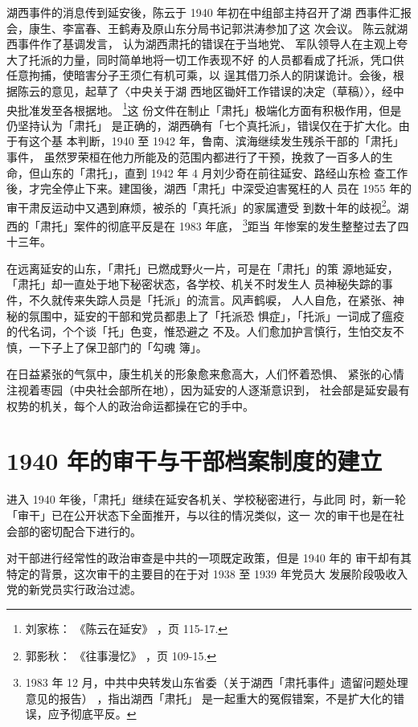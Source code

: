 湖西事件的消息传到延安後，陈云于 1940 年初在中组部主持召开了湖
西事件汇报会，康生、李富春、王鹤寿及原山东分局书记郭洪涛参加了这
次会议。
陈云就湖西事件作了基调发言，
认为湖西肃托的错误在于当地党、
军队领导人在主观上夸大了托派的力量，同时简单地将一切工作表现不好
的人员都看成了托派，凭口供任意拘捕，使暗害分子王须仁有机可乘，以
逞其借刀杀人的阴谋诡计。会後，根据陈云的意见，起草了〈中央关于湖
西地区锄奸工作错误的决定（草稿）〉，经中央批准发至各根据地。
\footnote{刘家栋：
《陈云在延安》
，页 115-17.}这
份文件在制止「肃托」极端化方面有积极作用，但是仍坚持认为「肃托」
是正确的，湖西确有「七个真托派」，错误仅在于扩大化。由于有这个基
本判断，1940 至 1942 年，鲁南、滨海继续发生残杀干部的「肃托」事件，
虽然罗荣桓在他力所能及的范围内都进行了干预，挽救了一百多人的生
命，但山东的「肃托」，直到 1942 年 4 月刘少奇在前往延安、路经山东检
查工作後，才完全停止下来。建国後，湖西「肃托」中深受迫害冤枉的人
员在 1955 年的审干肃反运动中又遇到麻烦，被杀的「真托派」的家属遭受
到数十年的歧视\footnote{郭影秋：
《往事漫忆》
，页 109-15.}。湖西的「肃托」案件的彻底平反是在 1983 年底，
\footnote{1983 年 12 月，中共中央转发山东省委（关于湖西「肃托事件」遗留问题处理意见的报告）
，指出湖西「肃托」
是一起重大的冤假错案，不是扩大化的错误，应予彻底平反。}距当
年惨案的发生整整过去了四十三年。

在远离延安的山东，「肃托」已燃成野火一片，可是在「肃托」的策
源地延安，「肃托」却一直处于地下秘密状态，各学校、机关不时发生人
员神秘失踪的事件，不久就传来失踪人员是「托派」的流言。风声鹤唳，
人人自危，在紧张、神秘的氛围中，延安的干部和党员都患上了「托派恐
惧症」，「托派」一词成了瘟疫的代名词，个个谈「托」色变，惟恐避之
不及。人们愈加护言慎行，生怕交友不慎，一下子上了保卫部门的「勾魂
簿」。

在日益紧张的气氛中，康生机关的形象愈来愈高大，人们怀着恐惧、
紧张的心情注视着枣园（中央社会部所在地），因为延安的人逐渐意识到，
社会部是延安最有权势的机关，每个人的政治命运都操在它的手中。

\section{1940 年的审干与干部档案制度的建立}
进入 1940 年後，「肃托」继续在延安各机关、学校秘密进行，与此同
时，新一轮「审干」已在公开状态下全面推开，与以往的情况类似，这一
次的审干也是在社会部的密切配合下进行的。

对干部进行经常性的政治审查是中共的一项既定政策，但是 1940 年的
审干却有其特定的背景，这次审干的主要目的在于对 1938 至 1939 年党员大
发展阶段吸收入党的新党员实行政治过滤。

